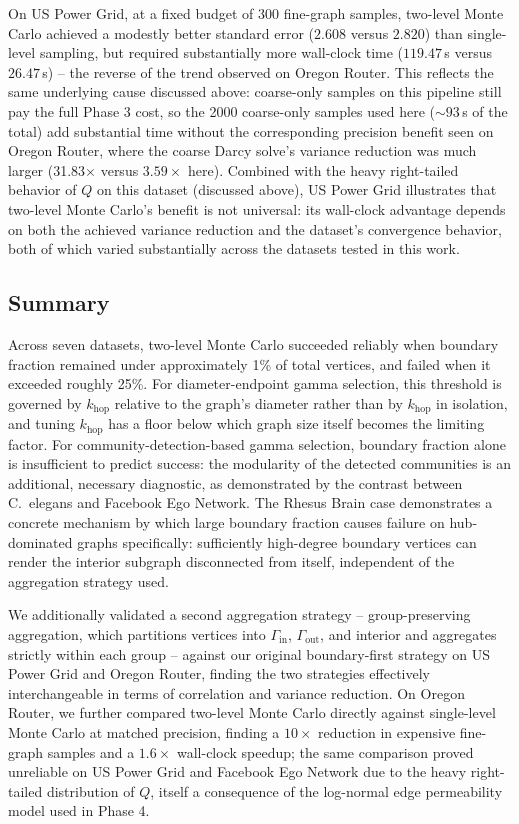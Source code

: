 \documentclass[a4paper,12pt]{amsart}
\numberwithin{equation}{section}
\begin{document}
On US Power Grid, at a fixed budget of 300 fine-graph samples, 
two-level Monte Carlo achieved a modestly better standard error 
($2.608$ versus $2.820$) than single-level sampling, but required 
substantially more wall-clock time ($119.47\,$s versus $26.47\,$s) -- 
the reverse of the trend observed on Oregon Router. This reflects the 
same underlying cause discussed above: coarse-only samples on this 
pipeline still pay the full Phase 3 cost, so the 2000 coarse-only 
samples used here ($\sim 93\,$s of the total) add substantial time 
without the corresponding precision benefit seen on Oregon Router, 
where the coarse Darcy solve's variance reduction was much larger 
(31.83$\times$ versus $3.59\times$ here). Combined with the heavy 
right-tailed behavior of $Q$ on this dataset (discussed above), 
US Power Grid illustrates that two-level Monte Carlo's benefit is not 
universal: its wall-clock advantage depends on both the achieved 
variance reduction and the dataset's convergence behavior, both of 
which varied substantially across the datasets tested in this work.

\subsection{Summary}

Across seven datasets, two-level Monte Carlo succeeded reliably when 
boundary fraction remained under approximately 1\% of total vertices, 
and failed when it exceeded roughly 25\%. For diameter-endpoint gamma 
selection, this threshold is governed by $k_{\text{hop}}$ relative to 
the graph's diameter rather than by $k_{\text{hop}}$ in isolation, and 
tuning $k_{\text{hop}}$ has a floor below which graph size itself 
becomes the limiting factor. For community-detection-based gamma 
selection, boundary fraction alone is insufficient to predict success: 
the modularity of the detected communities is an additional, necessary 
diagnostic, as demonstrated by the contrast between C.\ elegans and 
Facebook Ego Network. The Rhesus Brain case demonstrates a concrete 
mechanism by which large boundary fraction causes failure on 
hub-dominated graphs specifically: sufficiently high-degree boundary 
vertices can render the interior subgraph disconnected from itself, 
independent of the aggregation strategy used.

We additionally validated a second aggregation strategy -- 
group-preserving aggregation, which partitions vertices into 
$\Gamma_{\text{in}}$, $\Gamma_{\text{out}}$, and interior and 
aggregates strictly within each group -- against our original 
boundary-first strategy on US Power Grid and Oregon Router, finding 
the two strategies effectively interchangeable in terms of correlation 
and variance reduction. On Oregon Router, we further compared 
two-level Monte Carlo directly against single-level Monte Carlo at 
matched precision, finding a $10\times$ reduction in expensive 
fine-graph samples and a $1.6\times$ wall-clock speedup; the same 
comparison proved unreliable on US Power Grid and Facebook Ego Network 
due to the heavy right-tailed distribution of $Q$, itself a 
consequence of the log-normal edge permeability model used in Phase 4.
\end{document}

